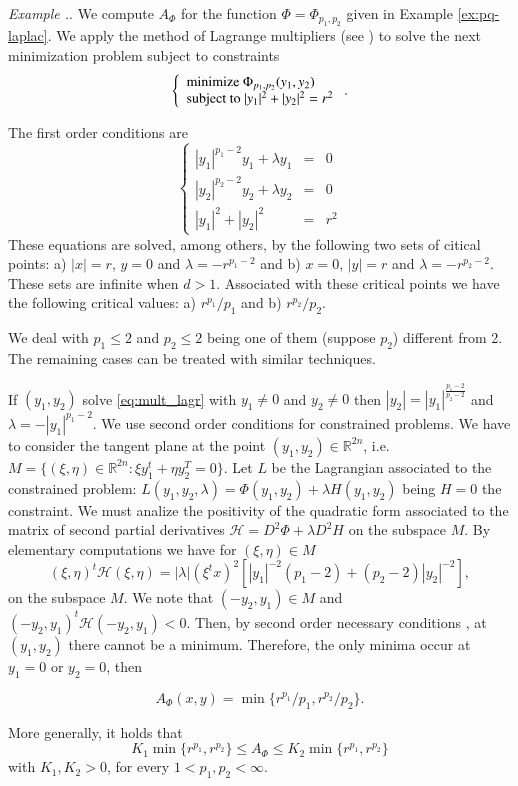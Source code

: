 \documentclass[twoside]{article}
\theoremstyle{remark}
\newcommand{\rr}{\mathbb{R}}
\renewcommand{\leq}{\leqslant}
\newcounter{example}[section]
\newenvironment{example}{\refstepcounter{example}\noindent\textit{Example \arabic{section}.\arabic{example}}.}{ }
\begin{document}
\begin{example} We compute $A_{\Phi}$ for the function $\Phi=\Phi_{p_1,p_2}$ given in Example \eqref{ex:pq-laplac}. We apply the method of Lagrange multipliers (see \cite[Ch. 11]{luenberger2015linear}) to solve the next minimization problem subject to constraints
\[
\left\{ \begin{array}{ll}
  \hbox{minimize } \Phi_{p_1,p_2}(y_1,y_2)\\
	 \hbox{subject to }|y_1|^2+|y_2|^2=r^2\\
        \end{array}
\right.
.\]

The first order conditions  are
\begin{equation}\label{eq:mult_lagr}
\left
\{
\begin{array}{ccc}
|y_1|^{p_1-2}y_1+ \lambda y_1&=&0
\\
|y_2|^{p_2-2}y_2+\lambda y_2&=&0
\\
|y_1|^2+|y_2|^2&=&r^2
\end{array}
\right.
\end{equation}
These equations are solved, among others, by the following two sets  of citical points: 
a) $|x|=r$, $y=0$ and $\lambda=-r^{p_1-2}$ and b) $x=0$, $|y|=r$ and $\lambda=-r^{p_2-2}$. These sets are infinite when $d>1$. 
Associated with these critical points we have the following critical values: a) $r^{p_1}/p_1$ and b) $r^{p_2}/p_2$.

We deal with $p_1\leq 2$ and $p_2\leq 2$ being one of them (suppose $p_2$) different from 2. The remaining cases can be treated with similar techniques. 


If $(y_1,y_2)$ solve \eqref{eq:mult_lagr} with $y_1\neq 0$ and $y_2 \neq 0$ then  $|y_2|=|y_1|^{\frac{p_1-2}{p_2-2}}$ and $\lambda=-|y_1|^{p_1-2}$.  We use second order conditions for constrained problems.
We have to consider  the tangent plane at the point $(y_1,y_2)\in \rr^{2n}$, i.e. 
$M=\{(\xi,\eta) \in \rr^{2n}: \xi y_1^t+\eta y_2^T=0\}$. Let $L$ be the Lagrangian associated to the constrained problem: $L(y_1,y_2,\lambda)=\Phi(y_1,y_2)+\lambda H(y_1,y_2)$ being $H=0$ the constraint. We must analize the positivity of the quadratic form associated to the matrix  of second partial derivatives $\mathcal{H}=D^2 \Phi+ \lambda D^2 H$ 
on the subspace $M$. By elementary computations we have for $(\xi,\eta)\in M$
\[(\xi,\eta)^t\mathcal{H}(\xi,\eta)=
|\lambda| (\xi^tx)^2 [|y_1|^{-2}(p_1-2)+(p_2-2)|y_2|^{-2}],\]
on the subspace $M$. We note that $(-y_2,y_1)\in M$ and $(-y_2,y_1)^t\mathcal{H}(-y_2,y_1)<0$.
Then, by second order necessary conditions \cite[p.333]{luenberger2015linear}, 
at $(y_1,y_2)$ there cannot be a minimum. Therefore, the only minima occur at $y_1=0$ or $y_2=0$, then 

\[A_{\Phi}(x,y)=\min\{r^{p_1}/p_1, r^{p_2}/p_2\}.\] 

More generally, it holds that 
\[
K_1\min\{r^{p_1}, r^{p_2}\}\leq A_{\Phi}\leq K_2\min\{r^{p_1}, r^{p_2}\}
\]
with $K_1,K_2>0$, for every $1<p_1,p_2<\infty$. 
\end{example}
\end{document}
